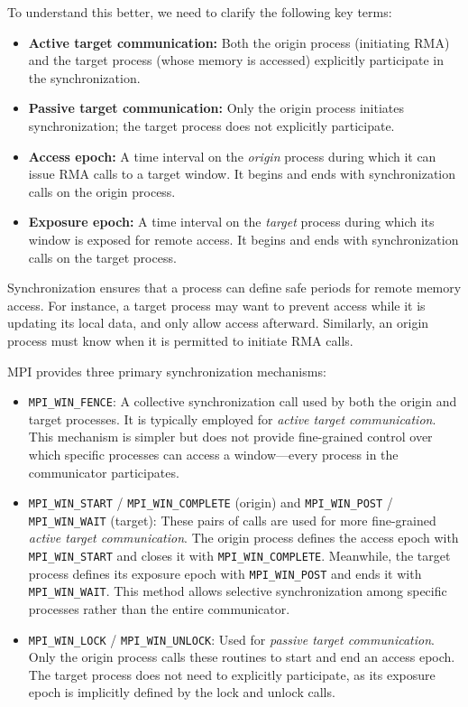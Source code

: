 \documentclass[12pt]{book}
\begin{document}
To understand this better, we need to clarify the following key terms:
\begin{itemize}
    \item \textbf{Active target communication:} Both the origin process (initiating RMA) and the target process (whose memory is accessed) explicitly participate in the synchronization.
    \item \textbf{Passive target communication:} Only the origin process initiates synchronization; the target process does not explicitly participate.
    \item \textbf{Access epoch:} A time interval on the \emph{origin} process during which it can issue RMA calls to a target window. It begins and ends with synchronization calls on the origin process.
    \item \textbf{Exposure epoch:} A time interval on the \emph{target} process during which its window is exposed for remote access. It begins and ends with synchronization calls on the target process.
\end{itemize}

Synchronization ensures that a process can define safe periods for remote memory access. For instance, a target process may want to prevent access while it is updating its local data, and only allow access afterward. Similarly, an origin process must know when it is permitted to initiate RMA calls.

MPI provides three primary synchronization mechanisms:

\begin{itemize}
    \item \texttt{MPI\_WIN\_FENCE}:  
    A collective synchronization call used by both the origin and target processes. It is typically employed for \emph{active target communication}. This mechanism is simpler but does not provide fine-grained control over which specific processes can access a window—every process in the communicator participates.
    
    \item \texttt{MPI\_WIN\_START} / \texttt{MPI\_WIN\_COMPLETE} (origin) and \texttt{MPI\_WIN\_POST} / \texttt{MPI\_WIN\_WAIT} (target):  
    These pairs of calls are used for more fine-grained \emph{active target communication}. The origin process defines the access epoch with \texttt{MPI\_WIN\_START} and closes it with \texttt{MPI\_WIN\_COMPLETE}. Meanwhile, the target process defines its exposure epoch with \texttt{MPI\_WIN\_POST} and ends it with \texttt{MPI\_WIN\_WAIT}. This method allows selective synchronization among specific processes rather than the entire communicator.
    
    \item \texttt{MPI\_WIN\_LOCK} / \texttt{MPI\_WIN\_UNLOCK}:  
    Used for \emph{passive target communication}. Only the origin process calls these routines to start and end an access epoch. The target process does not need to explicitly participate, as its exposure epoch is implicitly defined by the lock and unlock calls.
\end{itemize}
\end{document}
